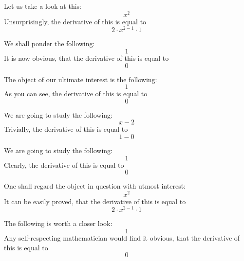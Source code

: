\documentclass{article}
\begin{document}
Let us take a look at this:
\begin{equation}
x ^{2 } 
\end{equation}
Unsurprisingly, the derivative of this is equal to
\begin{equation}
2 \cdot x ^{2 - 1 } \cdot 1 
\end{equation}

We shall ponder the following:
\begin{equation}
1 
\end{equation}
It is now obvious, that the derivative of this is equal to
\begin{equation}
0 
\end{equation}

The object of our ultimate interest is the following:
\begin{equation}
1 
\end{equation}
As you can see, the derivative of this is equal to
\begin{equation}
0 
\end{equation}

We are going to study the following:
\begin{equation}
x - 2 
\end{equation}
Trivially, the derivative of this is equal to
\begin{equation}
1 - 0 
\end{equation}

We are going to study the following:
\begin{equation}
1 
\end{equation}
Clearly, the derivative of this is equal to
\begin{equation}
0 
\end{equation}

One shall regard the object in question with utmost interest:
\begin{equation}
x ^{2 } 
\end{equation}
It can be easily proved, that the derivative of this is equal to
\begin{equation}
2 \cdot x ^{2 - 1 } \cdot 1 
\end{equation}

The following is worth a closer look:
\begin{equation}
1 
\end{equation}
Any self-respecting mathematician would find it obvious, that the derivative of this is equal to
\begin{equation}
0 
\end{equation}
\end{document}
